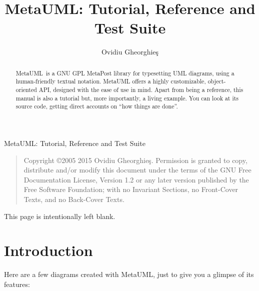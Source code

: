 \documentclass{article}
\newcommand{\metauml}{MetaUML}
\begin{document}
\metauml: Tutorial, Reference and Test Suite

\begin{quote}
    Copyright \copyright 2005 2015 Ovidiu Gheorghie\c{s}.
    Permission is granted to copy, distribute and/or modify this document
    under the terms of the GNU Free Documentation License, Version 1.2
    or any later version published by the Free Software Foundation;
    with no Invariant Sections, no Front-Cover Texts, and no Back-Cover Texts.
\end{quote}

\pagebreak
This page is intentionally left blank.

\pagebreak
\title{\metauml: Tutorial, Reference and Test Suite}

\author{Ovidiu Gheorghie\c{s}}

\maketitle

\begin{abstract}
\metauml\ is a GNU GPL MetaPost library for typesetting UML diagrams, using a human-friendly textual notation. MetaUML offers a highly customizable, object-oriented API, designed with the ease of use in mind. Apart from being a reference, this manual is also a tutorial but, more importantly, a living example. You can look at its source code, getting direct accounts on ``how things are done''.
\end{abstract}

\section{Introduction}

Here are a few diagrams created with MetaUML, just to give you a glimpse of its features:
\end{document}
